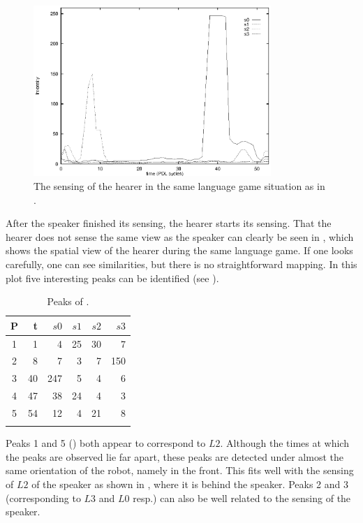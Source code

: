 \begin{figure}[b]
\centerline{\includegraphics[width=9cm]{lang_games/perception2.eps}}
\caption{The sensing of the hearer in the same language game situation as in .}
\label{f:perception2}
\end{figure}


After the speaker finished its sensing, the hearer starts its sensing. That the hearer does not sense the same view as the speaker can clearly be seen in , which shows the spatial view of the hearer during the same language game. If one looks carefully, one can see similarities, but there is no straightforward mapping. In this plot five interesting peaks can be identified (see ).

\begin{table}
\centering
\begin{tabular}{crrrrr}
\lsptoprule
P & t & $s0$ & $s1$ & $s2$ & $s3$\\
\midrule
1 & 1 & 4 & 25 & 30 & 7\\
2 & 8 & 7 & 3 & 7 & 150\\
3 & 40 & 247 & 5 & 4 & 6\\
4 & 47 & 38 & 24 & 4 & 3\\
5 & 54 & 12 & 4 & 21 & 8\\
\lspbottomrule
\end{tabular}
\caption{Peaks of .}
\label{t:perception2}
\end{table}

Peaks 1 and 5 () both appear to correspond to $L2$. Although the times at which the peaks are observed lie far apart, these peaks are detected under almost the same orientation of the robot, namely in the front. This fits well with the sensing of $L2$ of the speaker as shown in , where it is behind the speaker. Peaks 2 and 3 (corresponding to $L3$ and $L0$ resp.) can also be well related to the sensing of the speaker. 

